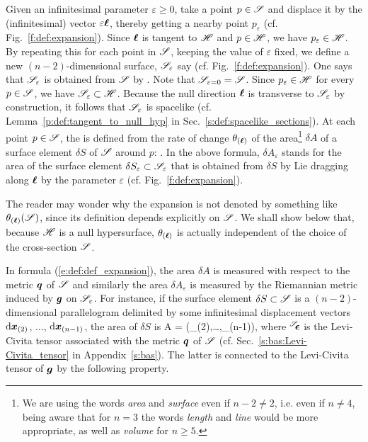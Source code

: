 \begin{greybox}
Given an infinitesimal parameter $\varepsilon\geq 0$, take a point
$p\in \mathscr{S}$ and displace it by the (infinitesimal) vector $\varepsilon \bm{\ell}$, thereby getting
a nearby point $p_\varepsilon$ (cf. Fig.~\ref{f:def:expansion}).
Since $\bm{\ell}$ is tangent to $\mathscr{H}$ and $p\in\mathscr{H}$, we have $p_\varepsilon\in\mathscr{H}$.
By repeating this for each point in $\mathscr{S}$,
keeping the value of $\varepsilon$ fixed, we define a new $(n-2)$-dimensional surface,
$\mathscr{S}_\varepsilon$ say (cf. Fig.~\ref{f:def:expansion}). One says that $\mathscr{S}_\varepsilon$ is obtained
from $\mathscr{S}$ by .
Note that $\mathscr{S}_{\varepsilon=0} = \mathscr{S}$.
Since $p_\varepsilon\in\mathscr{H}$ for every $p\in\mathscr{S}$, we have $\mathscr{S}_\varepsilon\subset \mathscr{H}$.
Because the null direction $\bm{\ell}$ is transverse to $\mathscr{S}_\varepsilon$ by construction, it
follows that $\mathscr{S}_\varepsilon$ is spacelike (cf. Lemma~\ref{p:def:tangent_to_null_hyp}
in Sec.~\ref{s:def:spacelike_sections}).
At each point $p\in\mathscr{S}$, the  is defined from the
rate of change $\theta_{(\bm{\ell})}$ of the area\footnote{We are using the words
\emph{area} and \emph{surface} even if $n-2 \not= 2$, i.e. even if $n\not = 4$,
being aware that for $n=3$ the words \emph{length} and \emph{line} would
be more appropriate, as well as \emph{volume} for $n\geq 5$.}
$\delta A$ of a surface element $\delta S$ of
$\mathscr{S}$ around $p$:
\be \label{e:def:def_expansion}
    .
\ee
In the above formula, $\delta A_\varepsilon$ stands for the area of the
surface element $\delta S_\varepsilon\subset \mathscr{S}_\varepsilon$ that is obtained from $\delta S$ by
Lie dragging along $\bm{\ell}$ by the parameter $\varepsilon$ (cf. Fig.~\ref{f:def:expansion}).
\end{greybox}


\begin{remark} \label{r:def:expansion_indpt_S}
The reader may wonder why the expansion is not denoted by something like
$\theta_{(\bm{\ell})}(\mathscr{S})$, since its definition depends explicitly on
$\mathscr{S}$. We shall show below that, because $\mathscr{H}$ is a null hypersurface, $\theta_{(\bm{\ell})}$
is actually independent of the choice of the cross-section $\mathscr{S}$.
\end{remark}

In formula (\ref{e:def:def_expansion}), the area $\delta A$ is measured with
respect to the metric $\bm{q}$ of $\mathscr{S}$ and similarly the area $\delta A_\varepsilon$
is measured by the Riemannian metric induced by $\bm{g}$ on $\mathscr{S}_\varepsilon$.
For instance, if the surface element $\delta S \subset\mathscr{S}$ is a $(n-2)$-dimensional
parallelogram delimited by some infinitesimal displacement vectors
$\mathrm{d}\bm{x}_{(2)}$, $\ldots$, $\mathrm{d}\bm{x}_{(n-1)}$, the area of $\delta S$ is
\be \label{e:def:A_wepsS_dx}
    \delta A = \wepsS(\D{}_{(2)},\ldots,\D{}_{(n-1)}),
\ee
where ${}^{\mathscr{S}}\!\!\bm{\epsilon}$ is the Levi-Civita tensor
associated with the metric $\bm{q}$
of $\mathscr{S}$ (cf. Sec.~\ref{s:bas:Levi-Civita_tensor} in Appendix~\ref{s:bas}).
The latter is connected to the Levi-Civita tensor of $\bm{g}$ by
the following property.

